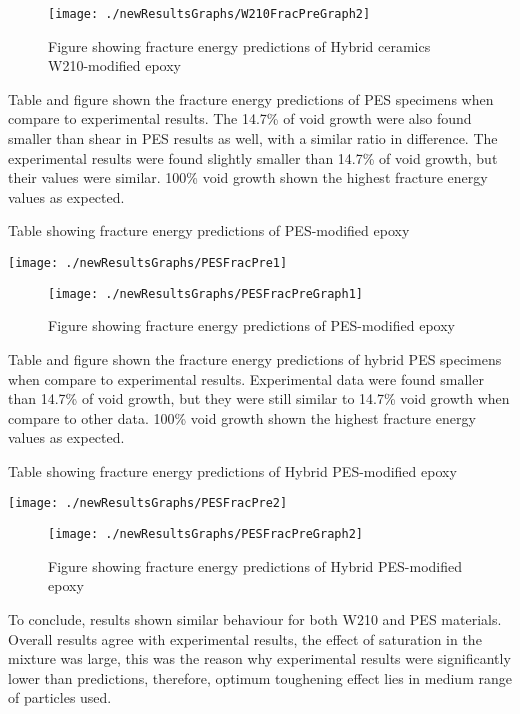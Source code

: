 \documentclass[numbers=noendperiod,chapterprefix=on]{icldt} %
\begin{document}
\begin{figure}[!hp]
\centering
\texttt{[image: ./newResultsGraphs/W210FracPreGraph2]}
\caption{Figure showing fracture energy predictions of Hybrid ceramics W210-modified epoxy}
\end{figure}
\FloatBarrier

Table and figure shown the fracture energy predictions of PES specimens when compare to experimental results. The 14.7\% of void growth were also found smaller than shear in PES results as well, with a similar ratio in difference. The experimental results were found slightly smaller than 14.7\% of void growth, but their values were similar. 100\% void growth shown the highest fracture energy values as expected.

\begin{table}[!htpb]
\centering
\caption{Table showing fracture energy predictions of PES-modified epoxy} %
\texttt{[image: ./newResultsGraphs/PESFracPre1]}
\end{table}
\FloatBarrier

\begin{figure}[!hp]
\centering
\texttt{[image: ./newResultsGraphs/PESFracPreGraph1]}
\caption{Figure showing fracture energy predictions of PES-modified epoxy}
\end{figure}
\FloatBarrier
Table and figure shown the fracture energy predictions of hybrid PES specimens when compare to experimental results. Experimental data were found smaller than 14.7\% of void growth, but they were still similar to 14.7\% void growth when compare to other data. 100\% void growth shown the highest fracture energy values as expected.

\begin{table}[!htpb]
\centering
\caption{Table showing fracture energy predictions of Hybrid PES-modified epoxy} %
\texttt{[image: ./newResultsGraphs/PESFracPre2]}
\end{table}
\FloatBarrier
\begin{figure}[!btp]
\centering
\texttt{[image: ./newResultsGraphs/PESFracPreGraph2]}
\caption{Figure showing fracture energy predictions of Hybrid PES-modified epoxy}
\end{figure}

To conclude, results shown similar behaviour for both W210 and PES materials. Overall results agree with experimental results, the effect of saturation in the mixture was large, this was the reason why experimental results were significantly lower than predictions, therefore, optimum toughening effect lies in medium range of particles used. 
\end{document}
